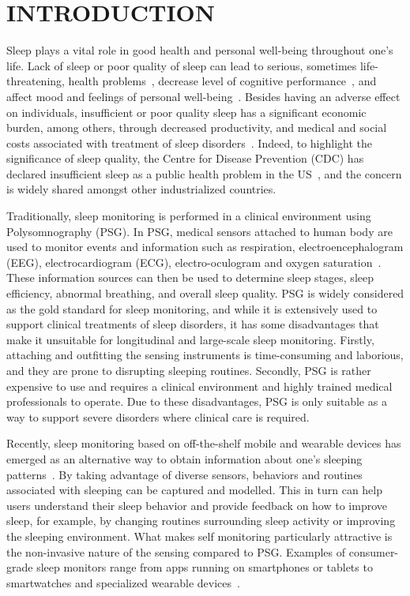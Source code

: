 \section{INTRODUCTION}\label{sec:1introduction}

Sleep plays a vital role in good health and personal well-being throughout one's life. Lack of sleep or poor quality of sleep can lead to serious, sometimes life-threatening, health problems~\cite{altena2008sleep,chandola2010effect,lallukka2016contribution}, decrease level of
cognitive performance~\cite{alhola07sleep,akerstedt07altered}, and affect mood and feelings of personal
well-being~\cite{paunio09longitudinal,pilcher97sleep}. Besides having an adverse effect on individuals, insufficient or poor quality sleep has a significant economic burden, among others, through decreased productivity, and medical and social costs associated with treatment of sleep disorders~\cite{hafner17why}. Indeed, to highlight the significance of sleep quality, the Centre for Disease Prevention (CDC) has declared insufficient sleep as a public health problem in the US~\cite{sleepreport}, and the concern is widely shared amongst other industrialized countries.


Traditionally, sleep monitoring is performed in a clinical environment using Polysomnography (PSG). In PSG, medical
sensors attached to human body are used to monitor events and information such as respiration, electroencephalogram (EEG), electrocardiogram (ECG), electro-oculogram and oxygen saturation~\cite{ebrahimi2008automatic,saper2005hypothalamic,oropesa1999sleep,langkvist2012sleep}. These information sources can then be used to determine sleep stages, sleep efficiency, abnormal breathing, and overall sleep quality. PSG is widely considered as the gold standard for sleep monitoring, and while it is extensively used to support clinical treatments of sleep disorders, it has some disadvantages that make it unsuitable for longitudinal and large-scale sleep monitoring. Firstly, {attaching and outfitting} the sensing instruments is time-consuming and laborious, and they are prone to disrupting sleeping routines. Secondly, PSG is rather expensive to use and requires a clinical environment and highly trained medical professionals to operate. Due to these disadvantages, PSG is only suitable as a way to support severe disorders {where} clinical care is required.

Recently, sleep monitoring based on off-the-shelf mobile and wearable devices has emerged as an alternative way to obtain information about one's sleeping patterns~\cite{ko15consumer,shelgikar2016sleep}. By taking advantage of diverse sensors, behaviors and routines associated with sleeping can be captured and modelled. This in turn can help users understand their sleep behavior and provide feedback on how to improve sleep, for example, by changing routines surrounding sleep activity or improving the sleeping environment. What makes self monitoring particularly attractive is the non-invasive nature of the sensing compared to PSG. Examples of consumer-grade sleep monitors range from apps running on smartphones or tablets to smartwatches and specialized wearable devices~\cite{zeo,Jawbone,SleepAndroid,fitbit,gu2016sleep,sleepmonitor}.

